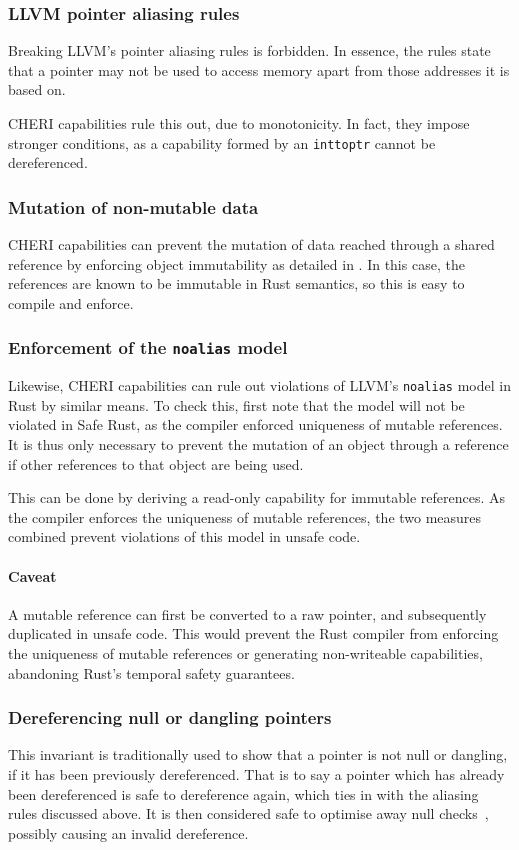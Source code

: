 \documentclass[dissertation.tex]{subfiles}
\begin{document}
\subsubsection{LLVM pointer aliasing rules}
Breaking LLVM's pointer aliasing rules is forbidden.
In essence, the rules state that a pointer may not be used to access
memory apart from those addresses it is based on.

CHERI capabilities rule this out, due to monotonicity.
In fact, they impose stronger conditions, as a capability formed by an
\texttt{inttoptr} cannot be dereferenced.

\subsubsection{Mutation of non-mutable data}
CHERI capabilities can prevent the mutation of data reached through a
shared reference by enforcing object immutability as detailed in
.
In this case, the references are known to be immutable in Rust
semantics, so this is easy to compile and enforce.

\subsubsection{Enforcement of the \texttt{noalias} model}
Likewise, CHERI capabilities can rule out violations of LLVM's
\texttt{noalias} model in Rust by similar means.
To check this, first note that the model will not be violated in Safe
Rust, as the compiler enforced uniqueness of mutable references.
It is thus only necessary to prevent the mutation of an object through a
reference if other references to that object are being used.

This can be done by deriving a read-only capability for immutable
references.
As the compiler enforces the uniqueness of mutable references, the two
measures combined prevent violations of this model in unsafe code.

\paragraph{Caveat}
A mutable reference can first be converted to a raw pointer, and
subsequently duplicated in unsafe code.
This would prevent the Rust compiler from enforcing the uniqueness of
mutable references or generating non-writeable capabilities, abandoning
Rust's temporal safety guarantees.

\subsubsection{Dereferencing null or dangling pointers}
This invariant is traditionally used to show that a pointer is not
null or dangling, if it has been previously dereferenced.
That is to say a pointer which has already been dereferenced is safe to
dereference again, which ties in with the aliasing rules discussed
above.
It is then considered safe to optimise away null
checks~\cite{wang2013towards,llvm-undef-dce}, possibly causing an
invalid dereference.
\end{document}
